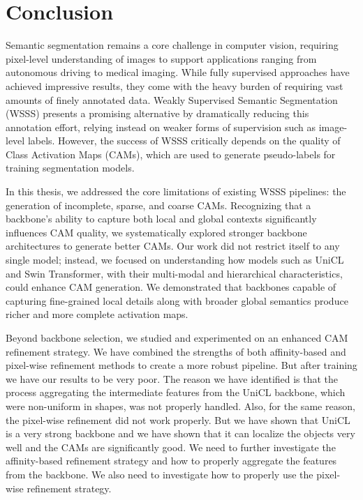 \chapter{Conclusion}
\label{chap:conclusion}

Semantic segmentation remains a core challenge in computer vision, requiring pixel-level understanding of images to support applications ranging from autonomous driving to medical imaging. While fully supervised approaches have achieved impressive results, they come with the heavy burden of requiring vast amounts of finely annotated data. Weakly Supervised Semantic Segmentation (WSSS) presents a promising alternative by dramatically reducing this annotation effort, relying instead on weaker forms of supervision such as image-level labels. However, the success of WSSS critically depends on the quality of Class Activation Maps (CAMs), which are used to generate pseudo-labels for training segmentation models.

In this thesis, we addressed the core limitations of existing WSSS pipelines: the generation of incomplete, sparse, and coarse CAMs. Recognizing that a backbone's ability to capture both local and global contexts significantly influences CAM quality, we systematically explored stronger backbone architectures to generate better CAMs. Our work did not restrict itself to any single model; instead, we focused on understanding how models such as UniCL and Swin Transformer, with their multi-modal and hierarchical characteristics, could enhance CAM generation. We demonstrated that backbones capable of capturing fine-grained local details along with broader global semantics produce richer and more complete activation maps.

Beyond backbone selection, we studied and experimented on an enhanced CAM refinement strategy. We have combined the strengths of both affinity-based and pixel-wise refinement methods to create a more robust pipeline. But after training we have our results to be very poor. The reason we have identified is that the process aggregating the intermediate features from the UniCL backbone, which were non-uniform in shapes, was not properly handled. Also, for the same reason, the pixel-wise refinement did not work properly. But we have shown that UniCL is a very strong backbone and we have shown that it can localize the objects very well and the CAMs are significantly good. We need to further investigate the affinity-based refinement strategy and how to properly aggregate the features from the backbone. We also need to investigate how to properly use the pixel-wise refinement strategy. 

